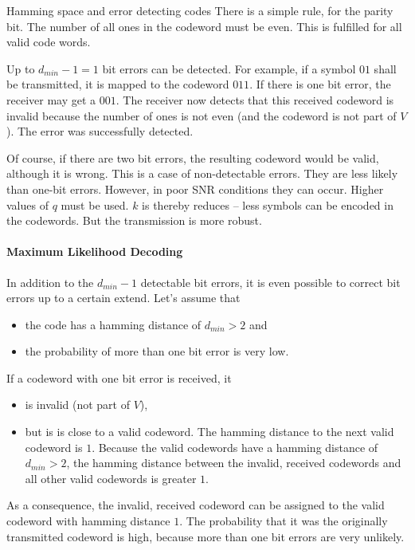 \begin{refsection}
\begin{example}{Hamming space and error detecting codes}
	There is a simple rule, for the parity bit. The number of all ones in the codeword must be even. This is fulfilled for all valid code words.
	
	Up to $d_{min} - 1 = 1$ bit errors can be detected. For example, if a symbol $01$ shall be transmitted, it is mapped to the codeword $011$. If there is one bit error, the receiver may get a $001$. The receiver now detects that this received codeword is invalid because the number of ones is not even (and the codeword is not part of $V$). The error was successfully detected.
	
	Of course, if there are two bit errors, the resulting codeword would be valid, although it is wrong. This is a case of non-detectable errors. They are less likely than one-bit errors. However, in poor \ac{SNR} conditions they can occur. Higher values of $q$ must be used. $k$ is thereby reduces -- less symbols can be encoded in the codewords. But the transmission is more robust.
\end{example}

\paragraph{Maximum Likelihood Decoding}

In addition to the $d_{min} - 1$ detectable bit errors, it is even possible to correct bit errors up to a certain extend. Let's assume that
\begin{itemize}
	\item the code has a hamming distance of $d_{min} > 2$ and
	\item the probability of more than one bit error is very low.
\end{itemize}
If a codeword with one bit error is received, it
\begin{itemize}
	\item is invalid (not part of $V$),
	\item but is is close to a valid codeword. The hamming distance to the next valid codeword is $1$. Because the valid codewords have a hamming distance of $d_{min} > 2$, the hamming distance between the invalid, received codewords and all other valid codewords is greater $1$.
\end{itemize}
As a consequence, the invalid, received codeword can be assigned to the valid codeword with hamming distance $1$. The probability that it was the originally transmitted codeword is high, because more than one bit errors are very unlikely.


\end{refsection}
